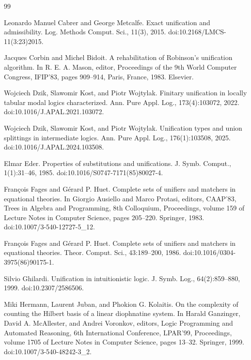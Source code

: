 \documentclass[10pt,a4paper]{amsart}
\begin{document}
\begin{thebibliography}{99}
\par\noindent  [24]  Leonardo Manuel Cabrer and George Metcalfe.  Exact unification and admissibility.  Log. Methods Comput. Sci., 11(3), 2015.  doi:10.2168/LMCS-11(3:23)2015.  
 
\par\noindent  [25]  Jacques Corbin and Michel Bidoit.  A rehabilitation of Robinson’s unification algorithm.  In R. E. A. Mason, editor, Proceedings of the 9th World Computer Congress, IFIP’83, pages 909–914, Paris, France, 1983. Elsevier.  
 
\par\noindent  [26]  Wojciech Dzik, Slawomir Kost, and Piotr Wojtylak.  Finitary unification in locally tabular modal logics characterized.  Ann. Pure Appl. Log., 173(4):103072, 2022.  doi:10.1016/J.APAL.2021.103072.  
 
\par\noindent  [27]  Wojciech Dzik, Slawomir Kost, and Piotr Wojtylak.  Unification types and union splittings in intermediate logics.  Ann. Pure Appl. Log., 176(1):103508, 2025.  doi:10.1016/J.APAL.2024.103508.  
 
\par\noindent  [28]  Elmar Eder.  Properties of substitutions and unifications.  J. Symb. Comput., 1(1):31–46, 1985.  doi:10.1016/S0747-7171(85)80027-4.  
 
\par\noindent  [29]  François Fages and Gérard P. Huet.  Complete sets of unifiers and matchers in equational theories.  In Giorgio Ausiello and Marco Protasi, editors, CAAP’83, Trees in Algebra and Programming, 8th Colloquium, Proceedings, volume 159 of Lecture Notes in Computer Science, pages 205–220. Springer, 1983.  doi:10.1007/3-540-12727-5\_12.  
 
\par\noindent  [30]  François Fages and Gérard P. Huet.  Complete sets of unifiers and matchers in equational theories.  Theor. Comput. Sci., 43:189–200, 1986.  doi:10.1016/0304-3975(86)90175-1.  
 
\par\noindent  [31]  Silvio Ghilardi.  Unification in intuitionistic logic.  J. Symb. Log., 64(2):859–880, 1999.  doi:10.2307/2586506.  
 
\par\noindent  [32]  Miki Hermann, Laurent Juban, and Phokion G. Kolaitis.  On the complexity of counting the Hilbert basis of a linear diophnatine system.  In Harald Ganzinger, David A. McAllester, and Andrei Voronkov, editors, Logic Programming and Automated Reasoning, 6th International Conference, LPAR’99, Proceedings, volume 1705 of Lecture Notes in Computer Science, pages 13–32. Springer, 1999.  doi:10.1007/3-540-48242-3\_2.  
 

\end{thebibliography}
\end{document}
